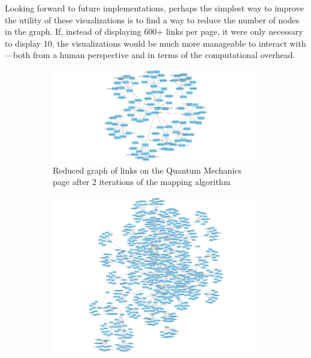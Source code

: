 \documentclass[man, 12pt, floatsintext, donotrepeattitle]{apa6}
\begin{document}
Looking forward to future implementations, perhaps the simplest way to improve
the utility of these visualizations is
to find a way to reduce the number of nodes in the graph.  If, instead of
displaying
600+ links per page, it were only necessary to display 10, the visualizations
would be much more manageable to interact with---both from a human perspective
and in terms of the computational overhead.
\begin{figure}
    \centering
    \begin{subfigure}[b]{0.3\textwidth}
        \includegraphics[width=\textwidth]{Resources/10max/2iterations/QuantumMechanics_v_104_e_110_b.png}
        \caption{\fontsize{10pt}{12pt}\selectfont Reduced graph of links on the
        Quantum Mechanics page after 2 iterations of the mapping algorithm}
        \label{fig:2iterations}
    \end{subfigure}
    \begin{subfigure}[b]{0.3\textwidth}
        \includegraphics[width=\textwidth]{Resources/10max/3iterations/QuantumMechanics_v_717_e_1009_b.png}

\end{subfigure}
\end{figure}
\end{document}

